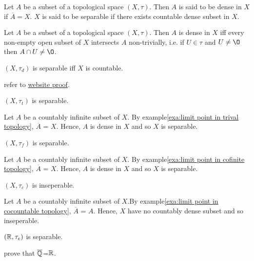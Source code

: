 \begin{definition}{}{}
    Let $A$ be a subset of a topological space $(X,\tau)$. Then $A$ is said to be dense in $X$ if $\overline{A}=X$.
    $X$ is said to be separable if there exists countable dense subset in $X$.
\end{definition}

\begin{proposition}{}{}
   Let $A$ be a subset of a topological space $(X,\tau)$. Then $A$ is dense in $X$ iff every non-empty open subset of $X$ intersects $A$ non-trivially, i.e.
   if $U\in \tau$ and $U\neq \O$ then $A\cap U\neq \O$. 
 \end{proposition}


\begin{example}{}{}
    $(X,\tau_d)$ is separable iff $X$ is countable. 
\end{example}
refer to \href{https://astarmathsandphysics.com/university-maths-notes/topology/2198-proof-that-a-discrete-space-is-separable-if-and-only-if-it-is-countable.html}{website proof}.


\begin{example}{}{}
    $(X,\tau_t)$ is separable. 
\end{example}
Let $A$ be a countably infinite subset of $X$. By example\ref{exa:limit point in trival topology}, 
$\overline{A}$ = $X$. Hence, $A$ is dense in $X$ and so $X$ is separable.
\begin{example}{}{}
    $(X,\tau_f)$ is separable.
\end{example}
    Let $A$ be a countably infinite subset of $X$. By example\ref{exa:limit point in cofinite topology}, 
    $\overline{A}$ = $X$. Hence, $A$ is dense in $X$ and so $X$ is separable.

\begin{example}{}{}
    $(X,\tau_c)$ is inseperable. 
\end{example}
    Let $A$ be a countably infinite subset of $X$.By example\ref{exa:limit point in cocountable topology},
    $\overline{A}$ = $A$. Hence, $X$ have no countably dense subset and so inseperable.

\begin{example}{}{}
    $(\mathbb{R},\tau_e)$ is separable.
\end{example}
prove that $\overline{\mathbb{Q}}$=$\mathbb{R}$.


